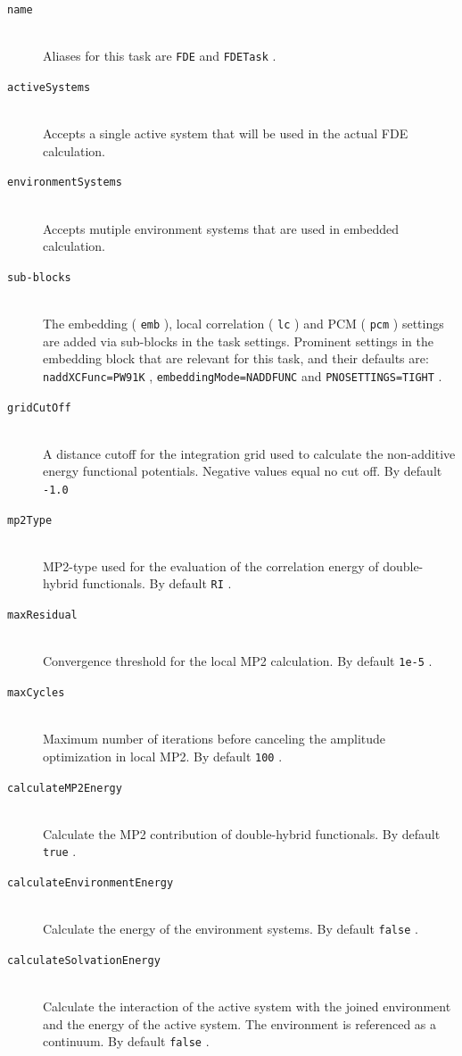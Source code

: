 \documentclass[bibliography=totocnumbered,a4paper,10pt,oneside]{scrbook}
\newcommand{\ttt}[1]{%
  \begingroup\setlength{\fboxsep}{1pt}%
  \colorbox{serenity-green!30}{\texttt{\hspace*{2pt}\vphantom{(g}#1\hspace*{2pt}}}%
  \endgroup
}
\begin{document}
\begin{description}
	 \item [\texttt{name}]\hfill \\
	Aliases for this task are \ttt{FDE} and \ttt{FDETask}.
	\item [\texttt{activeSystems}]\hfill \\
	Accepts a single active system that will be used in the actual FDE calculation.
	\item [\texttt{environmentSystems}]\hfill \\
	Accepts mutiple environment systems that are used in embedded calculation.
	\item [\texttt{sub-blocks}]\hfill \\
	The embedding (\ttt{emb}), local correlation (\ttt{lc}) and PCM (\ttt{pcm}) settings are added via sub-blocks in the task settings.
	Prominent settings in the embedding block that are relevant for this task, and their defaults are:
	\ttt{naddXCFunc=PW91K}, \ttt{embeddingMode=NADDFUNC} and \ttt{PNOSETTINGS=TIGHT}.
	\item [\texttt{gridCutOff}] \hfill \\
    A distance cutoff for the integration grid used to calculate the non-additive  energy functional potentials. Negative values equal no cut off. By default \ttt{-1.0}
	\item [\texttt{mp2Type}] \hfill \\
	MP2-type used for the evaluation of the correlation energy of double-hybrid functionals. By default \ttt{RI}.
	\item [\texttt{maxResidual}] \hfill \\
	Convergence threshold for the local MP2 calculation. By default \ttt{1e-5}.
	\item [\texttt{maxCycles}] \hfill \\
	Maximum number of iterations before canceling the amplitude optimization in local MP2. By default \ttt{100}.
	\item [\texttt{calculateMP2Energy}] \hfill \\
	Calculate the MP2 contribution of double-hybrid functionals. By default \ttt{true}.
	\item [\texttt{calculateEnvironmentEnergy}] \hfill \\
	Calculate the energy of the environment systems. By default \ttt{false}.
	\item [\texttt{calculateSolvationEnergy}] \hfill \\
	Calculate the interaction of the active system with the joined environment and the energy of the active system. The environment is referenced
	as a continuum. By default \ttt{false}.
\end{description}
\end{document}
